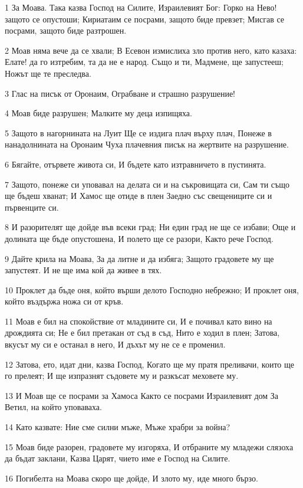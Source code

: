 \par 1 За Моава. Така казва Господ на Силите, Израилевият Бог: Горко на Нево! защото се опустоши; Кириатаим се посрами, защото биде превзет; Мисгав се посрами, защото биде разтрошен.
\par 2 Моав няма вече да се хвали; В Есевон измислиха зло против него, като казаха: Елате! да го изтребим, та да не е народ. Също и ти, Мадмене, ще запустееш; Ножът ще те преследва.
\par 3 Глас на писък от Оронаим, Ограбване и страшно разрушение!
\par 4 Моав биде разрушен; Малките му деца изпищяха.
\par 5 Защото в нагорнината на Луит Ще се издига плач върху плач, Понеже в нанадолнината на Оронаим Чуха плачевния писък на жертвите на разрушение.
\par 6 Бягайте, отървете живота си, И бъдете като изтравничето в пустинята.
\par 7 Защото, понеже си уповавал на делата си и на съкровищата си, Сам ти също ще бъдеш хванат; И Хамос ще отиде в плен Заедно със свещениците си и първенците си.
\par 8 И разорителят ще дойде във всеки град; Ни един град не ще се избави; Още и долината ще бъде опустошена, И полето ще се разори, Както рече Господ.
\par 9 Дайте крила на Моава, За да литне и да избяга; Защото градовете му ще запустеят. И не ще има кой да живее в тях.
\par 10 Проклет да бъде оня, който върши делото Господно небрежно; И проклет оня, който въздържа ножа си от кръв.
\par 11 Моав е бил на спокойствие от младините си, И е почивал като вино на дрождията си; Не е бил претакан от съд в съд, Нито е ходил в плен; Затова, вкусът му си е останал в него, И дъхът му не се е променил.
\par 12 Затова, ето, идат дни, казва Господ, Когато ще му пратя преливачи, които ще го прелеят; И ще изпразнят съдовете му и разкъсат меховете му.
\par 13 И Моав ще се посрами за Хамоса Както се посрами Израилевият дом За Ветил, на който уповаваха.
\par 14 Като казвате: Ние сме силни мъже, Мъже храбри за война?
\par 15 Моав биде разорен, градовете му изгоряха, И отбраните му младежи слязоха да бъдат заклани, Казва Царят, чието име е Господ на Силите.
\par 16 Погибелта на Моава скоро ще дойде, И злото му, иде много бързо.
